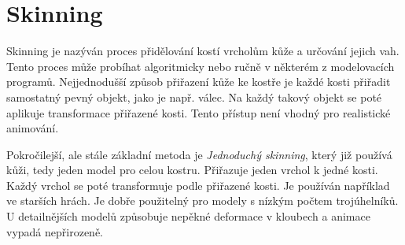 \section{Skinning}
Skinning \cite{skinningMethods} je nazýván proces přidělování kostí vrcholům kůže a určování jejich vah. Tento proces může probíhat algoritmicky nebo ručně v některém z modelovacích programů. Nejjednodušší způsob přiřazení kůže ke kostře je každé kosti přiřadit samostatný pevný objekt, jako je např. válec. Na každý takový objekt se poté aplikuje transformace přiřazené kosti. Tento přístup není vhodný pro realistické animování.

Pokročilejší, ale stále základní metoda je \textit{Jednoduchý skinning}, který již používá kůži, tedy jeden model pro celou kostru. Přiřazuje jeden vrchol k jedné kosti. Každý vrchol se poté transformuje podle přiřazené kosti. Je používán například ve starších hrách. Je dobře použitelný pro modely s nízkým počtem trojúhelníků. U detailnějších modelů způsobuje nepěkné deformace v kloubech a animace vypadá nepřirozeně. 

